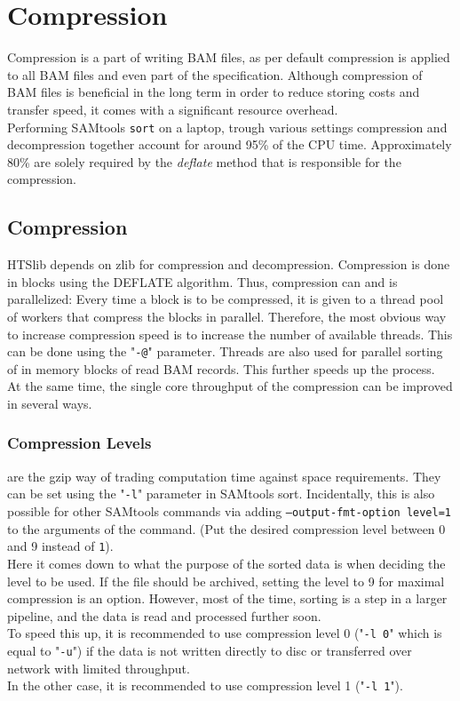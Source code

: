 \section{Compression} 
Compression is a part of writing BAM files, as per default compression is applied to all BAM files and even part of the specification. Although compression of BAM files is beneficial in the long term in order to reduce storing costs and transfer speed, it comes with a significant resource overhead. \\
Performing SAMtools \texttt{sort} on a laptop, trough various settings compression and decompression together account for around 95\% of the CPU time. Approximately 80\% are solely required by the \textit{deflate} method that is responsible for the compression.

\subsection{Compression}
HTSlib depends on zlib for compression and decompression. Compression is done in blocks using the DEFLATE algorithm. Thus, compression can and is parallelized: Every time a block is to be compressed, it is given to a thread pool of workers that compress the blocks in parallel. Therefore, the most obvious way to increase compression speed is to increase the number of available threads. This can be done using the "\texttt{-@}" parameter. Threads are also used for parallel sorting of in memory blocks of read BAM records. This further speeds up the process. \\
At the same time, the single core throughput of the compression can be improved in several ways. \\

\subsubsection{Compression Levels} are  the gzip way of trading computation time against space requirements. They can be set using the "\texttt{-l}" parameter in SAMtools sort. Incidentally, this is also possible for other SAMtools commands via adding \texttt{--output-fmt-option level=1} to the arguments of the command. (Put the desired compression level between 0 and 9 instead of \texttt{1}). \\
Here it comes down to what the purpose of the sorted data is when deciding the level to be used. If the file should be archived, setting the level to 9 for maximal compression is an option. However, most of the time, sorting is a step in a larger pipeline, and the data is read and processed further soon. \\
To speed this up, it is recommended to use compression level 0 ("\texttt{-l 0}" which is equal to "\texttt{-u}") if the data is not written directly to  disc or transferred over network with limited throughput. \\
In the other case, it is recommended to use compression level 1 ("\texttt{-l 1}").

